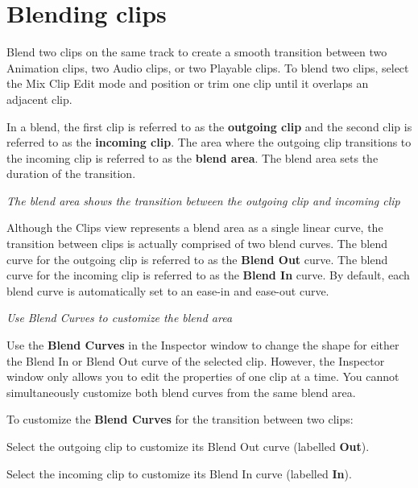 \chapter{Blending clips}
\hypertarget{md__library_2_package_cache_2com_8unity_8timeline_0d1_87_86_2_documentation_0i_2clp__blend}{}\label{md__library_2_package_cache_2com_8unity_8timeline_0d1_87_86_2_documentation_0i_2clp__blend}
\label{md__library_2_package_cache_2com_8unity_8timeline_0d1_87_86_2_documentation_0i_2clp__blend_autotoc_md1109}%
%
 Blend two clips on the same track to create a smooth transition between two Animation clips, two Audio clips, or two Playable clips. To blend two clips, select the Mix Clip Edit mode and position or trim one clip until it overlaps an adjacent clip.

In a blend, the first clip is referred to as the {\bfseries{outgoing clip}} and the second clip is referred to as the {\bfseries{incoming clip}}. The area where the outgoing clip transitions to the incoming clip is referred to as the {\bfseries{blend area}}. The blend area sets the duration of the transition.



{\itshape The blend area shows the transition between the outgoing clip and incoming clip}

Although the Clips view represents a blend area as a single linear curve, the transition between clips is actually comprised of two blend curves. The blend curve for the outgoing clip is referred to as the {\bfseries{Blend Out}} curve. The blend curve for the incoming clip is referred to as the {\bfseries{Blend In}} curve. By default, each blend curve is automatically set to an ease-\/in and ease-\/out curve.



{\itshape Use Blend Curves to customize the blend area}

Use the {\bfseries{Blend Curves}} in the Inspector window to change the shape for either the Blend In or Blend Out curve of the selected clip. However, the Inspector window only allows you to edit the properties of one clip at a time. You cannot simultaneously customize both blend curves from the same blend area.

To customize the {\bfseries{Blend Curves}} for the transition between two clips\+:


\begin{DoxyEnumerate}
\item Select the outgoing clip to customize its Blend Out curve (labelled {\bfseries{Out}}).
\item Select the incoming clip to customize its Blend In curve (labelled {\bfseries{In}}).
\end{DoxyEnumerate}

